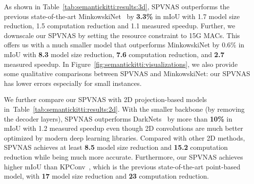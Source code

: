 \documentclass[runningheads]{llncs}
\newcommand{\fig}[1]{Figure~\ref{#1}}
\newcommand{\tab}[1]{Table~\ref{#1}}
\def\modelshort{SPVNAS\xspace}
\begin{document}
As shown in \tab{tab:semantickitti:results:3d}, \modelshort outperforms the previous state-of-the-art MinkowskiNet~\cite{choy20194d} by \textbf{3.3\%} in mIoU with 1.7 model size reduction, 1.5 computation reduction and 1.1 measured speedup. Further, we downscale our \modelshort by setting the resource constraint to 15G MACs. This offers us with a much smaller model that outperforms MinkowskiNet by 0.6\% in mIoU with \textbf{8.3} model size reduction, \textbf{7.6} computation reduction, and \textbf{2.7} measured speedup. In \fig{fig:semantickitti:visualizations}, we also provide some qualitative comparisons between \modelshort and MinkowskiNet: our \modelshort has lower errors especially for small instances.

We further compare our \modelshort with 2D projection-based models in~\tab{tab:semantickitti:results:2d}. With the smaller backbone (by removing the decoder layers), \modelshort outperforms DarkNets~\cite{behley2019semantickitti} by more than \textbf{10\%} in mIoU with 1.2 measured speedup even though 2D convolutions are much better optimized by modern deep learning libraries. Compared with other 2D methods, \modelshort achieves at least \textbf{8.5} model size reduction and \textbf{15.2} computation reduction while being much more accurate. Furthermore, our \modelshort achieves higher mIoU than KPConv~\cite{thomas2019kpconv}, which is the previous state-of-the-art point-based model, with \textbf{17} model size reduction and \textbf{23} computation reduction.
\end{document}

